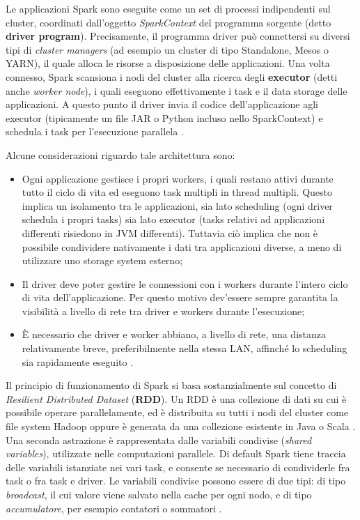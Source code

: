 \documentclass[12pt]{article}
\begin{document}
Le applicazioni Spark sono eseguite come un set di processi indipendenti sul cluster, coordinati dall'oggetto \textit{SparkContext} del programma sorgente (detto \textbf{driver program}). Precisamente, il programma driver può connettersi su diversi tipi di \textit{cluster managers} (ad esempio un cluster di tipo Standalone, Mesos o YARN), il quale alloca le risorse a disposizione delle applicazioni. Una volta connesso, Spark scansiona i nodi del cluster alla ricerca degli \textbf{executor} (detti anche \textit{worker node}), i quali eseguono effettivamente i task e il data storage delle applicazioni. A questo punto il driver invia il codice dell'applicazione agli executor (tipicamente un file JAR o Python incluso nello SparkContext) e schedula i task per l'esecuzione parallela \cite{spark}. 

Alcune considerazioni riguardo tale architettura sono: 
\begin{itemize}
	\item Ogni applicazione gestisce i propri workers, i quali restano attivi durante tutto il ciclo di vita ed eseguono task multipli in thread multipli. Questo implica un isolamento tra le applicazioni, sia lato scheduling (ogni driver schedula i propri tasks) sia lato executor (tasks relativi ad applicazioni differenti risiedono in JVM differenti). Tuttavia ciò implica che non è possibile condividere nativamente i dati tra applicazioni diverse, a meno di utilizzare uno storage system esterno;
	\item Il driver deve poter gestire le connessioni con i workers durante l'intero ciclo di vita dell'applicazione. Per questo motivo dev'essere sempre garantita la visibilità a livello di rete tra driver e workers durante l'esecuzione;
	\item \`E necessario che driver e worker abbiano, a livello di rete, una distanza relativamente breve, preferibilmente nella stessa LAN, affinché lo scheduling sia rapidamente eseguito \cite{spark}. 
\end{itemize}

Il principio di funzionamento di Spark si basa sostanzialmente sul concetto di \textit{Resilient Distributed Dataset} (\textbf{RDD}). Un RDD è una collezione di dati su cui è possibile operare parallelamente, ed è distribuita su tutti i nodi del cluster come file system Hadoop oppure è generata da una collezione esistente in Java o Scala \cite{spark}. \\

Una seconda astrazione è rappresentata dalle variabili condivise (\textit{shared variables}), utilizzate nelle computazioni parallele. Di default Spark tiene traccia delle variabili istanziate nei vari task, e consente se necessario di condividerle fra task o fra task e driver. Le variabili condivise possono essere di due tipi: di tipo \textit{broadcast}, il cui valore viene salvato nella cache per ogni nodo, e di tipo \textit{accumulatore}, per esempio contatori o sommatori \cite{spark}.
\end{document}
